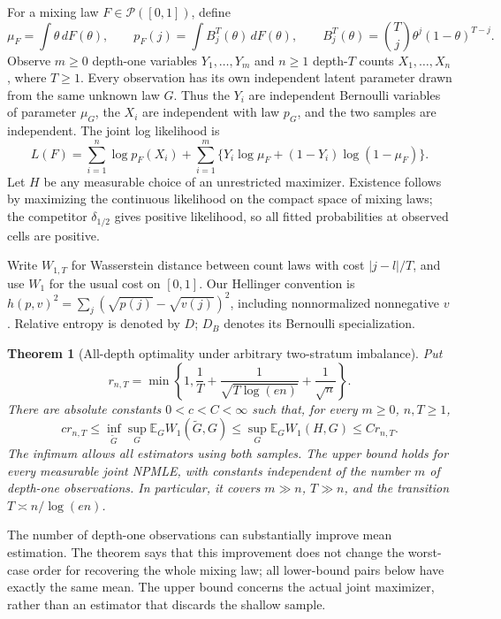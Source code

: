 \documentclass[11pt,a4paper]{article}
\newtheorem{theorem}{Theorem}[section]
\theoremstyle{definition}
\theoremstyle{remark}
\numberwithin{equation}{section}
\begin{document}
For a mixing law $F\in\mathcal P([0,1])$, define
\[
 \mu_F=\int\theta\,dF(\theta),\qquad
 p_F(j)=\int B_j^T(\theta)\,dF(\theta),\qquad
 B_j^T(\theta)=\binom Tj\theta^j(1-\theta)^{T-j}.
\]
Observe $m\ge0$ depth-one variables $Y_1,\ldots,Y_m$ and $n\ge1$
depth-$T$ counts $X_1,\ldots,X_n$, where $T\ge1$.  Every observation has
its own independent latent parameter drawn from the same unknown law $G$.
Thus the $Y_i$ are independent Bernoulli variables of parameter $\mu_G$,
the $X_i$ are independent with law $p_G$, and the two samples are independent.
The joint log likelihood is
\begin{equation}\label{p3:eq:het-likelihood}
 L(F)=\sum_{i=1}^n\log p_F(X_i)
       +\sum_{i=1}^m\{Y_i\log\mu_F+(1-Y_i)\log(1-\mu_F)\}.
\end{equation}
Let $H$ be any measurable choice of an unrestricted maximizer.
Existence follows by maximizing the continuous likelihood on the compact
space of mixing laws; the competitor $\delta_{1/2}$ gives positive
likelihood, so all fitted probabilities at observed cells are positive.

Write $W_{1,T}$ for Wasserstein distance between count laws with cost
$|j-l|/T$, and use $W_1$ for the usual cost on $[0,1]$.
Our Hellinger convention is
$h(p,v)^2=\sum_j(\sqrt{p(j)}-\sqrt{v(j)})^2$, including nonnormalized
nonnegative $v$.  Relative entropy is denoted by $D$; $D_B$ denotes its
Bernoulli specialization.

\begin{theorem}[All-depth optimality under arbitrary two-stratum imbalance]
\label{p3:thm:het-main}
Put
\[
 r_{n,T}=\min\left\{1,\frac1T+
              \frac1{\sqrt{T\log(en)}}+\frac1{\sqrt n}\right\}.
\]
There are absolute constants $0<c<C<\infty$ such that, for every
$m\ge0$, $n,T\ge1$,
\begin{equation}\label{p3:eq:het-main}
 c r_{n,T}
 \le\inf_{\widetilde G}\sup_G\mathbb E_G W_1(\widetilde G,G)
 \le\sup_G\mathbb E_G W_1(H,G)
 \le C r_{n,T}.
\end{equation}
The infimum allows all estimators using both samples.  The upper bound
holds for every measurable joint NPMLE, with constants independent of the
number $m$ of depth-one observations.  In particular, it covers
$m\gg n$, $T\gg n$, and the transition $T\asymp n/\log(en)$.
\end{theorem}

The number of depth-one observations can substantially improve mean
estimation.  The theorem says that this improvement does not change the
worst-case order for recovering the whole mixing law; all lower-bound pairs
below have exactly the same mean.  The upper bound concerns the actual joint
maximizer, rather than an estimator that discards the shallow sample.
\end{document}
